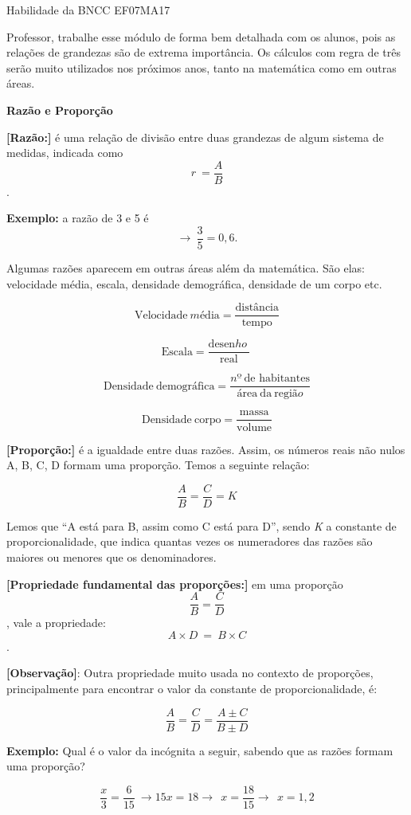 Habilidade da BNCC EF07MA17

Professor, trabalhe esse módulo de forma bem detalhada com os alunos,
pois as relações de grandezas são de extrema importância. Os cálculos
com regra de três serão muito utilizados nos próximos anos, tanto na
matemática como em outras áreas.

\textbf{Razão e Proporção}

\textbf{{[}Razão:{]}} é uma relação de divisão entre duas grandezas de
algum sistema de medidas, indicada como \[r\  = \frac{A}{B}\].

\textbf{Exemplo:} a razão de 3 e 5 é
\[\rightarrow \ \frac{3}{5} = 0,6.\]

Algumas razões aparecem em outras áreas além da matemática. São elas:
velocidade média, escala, densidade demográfica, densidade de um corpo
etc.

\[\text{Vel}\text{ocidade}\ mé\text{dia} = \frac{\text{dist}â\text{ncia}}{\text{tempo}}\]

\[\text{Escala} = \frac{\text{desen}ho\ }{\text{real}}\ \]

\[\text{Densidade}\ \text{demogr}á\text{fica} = \frac{nº\ \text{de}\text{\ h}\text{abitantes}}{á\text{rea}\ \text{da}\ \text{regi}ão}\]

\[\text {Densidade}\ \text{corpo} = \frac{\text{massa}}{\text{volume}}\]

\textbf{{[}Proporção:{]}} é a igualdade entre duas razões. Assim, os
números reais não nulos A, B, C, D formam uma proporção. Temos a
seguinte relação:

\[\frac{A}{B} = \frac{C}{D} = K\]

Lemos que ``A está para B, assim como C está para D'', sendo \emph{K} a
constante de proporcionalidade, que indica quantas vezes os numeradores
das razões são maiores ou menores que os denominadores.

\textbf{{[}Propriedade fundamental das proporções:{]}} em uma proporção
\[\frac{A}{B} = \frac{C}{D}\], vale a propriedade:
\[A \times D\  = \ B \times C\].

\textbf{{[}Observação{]}}: Outra propriedade muito usada no contexto de
proporções, principalmente para encontrar o valor da constante de
proporcionalidade, é:

\[\frac{A}{B} = \frac{C}{D} = \frac{A \pm C}{B \pm D}\]

\textbf{Exemplo:} Qual é o valor da incógnita a seguir, sabendo que as
razões formam uma proporção?

\[\frac{x}{3} = \frac{6}{15}\  \rightarrow 15x = 18 \rightarrow \ \ x = \frac{18}{15} \rightarrow \ \ x = 1,2\]

